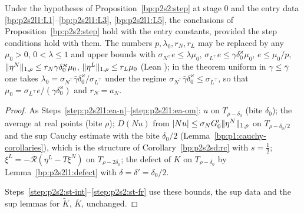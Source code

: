 \begin{proposition}\label{bp:p2s2l1:entryB}
Under the hypotheses of Proposition~\ref{bp:p2s2:step} at stage $0$ and the entry data \ref{bp:p2s2l1:L1}--\ref{bp:p2s2l1:L3}, \ref{bp:p2s2l1:L5}, the
conclusions of Proposition~\ref{bp:p2s2:step} hold with the entry constants, provided the step conditions hold with them. The numbers
$p,\lambda_0,r_N,r_L$ may be replaced by any $\mu_0>0$, $0<\lambda\le1$ and upper bounds with $\sigma_{N^\top}e\le\lambda\mu_0$,
$\sigma_{L^\top}e\le\gamma\delta_0^\varkappa\mu_0$, $e\le\mu_0/p$, $\lVert \eta^N\rVert_{1,\rho}\le r_N\gamma\delta_0^\varkappa\mu_0$, $\lVert \eta^L\rVert_{1,\rho}\le r_L\mu_0$ (Lean
); in the theorem uniform in $\gamma\le\bar\gamma$ one takes $\lambda_0=\sigma_{N^\top}\bar\gamma\delta_0^\varkappa/\sigma_{L^\top}$ under the regime
$\sigma_{N^\top}\bar\gamma\delta_0^\varkappa\le\sigma_{L^\top}$, so that $\mu_0=\sigma_{L^\top}e/(\gamma\delta_0^\varkappa)$ and $r_N=a_N$.
\end{proposition}

\begin{proof}
\label{step:p2s2l1:eb-in}
As Steps~\ref{step:p2s2l1:ea-n}--\ref{step:p2s2l1:ea-om}: $u$ on $T_{\rho-\delta_0}$ (bite $\delta_0$); the average at real points (bite $\rho$); $D(Nu)$ from
$\lvert Nu\rvert\le\sigma_NG_0'\lVert \eta^N\rVert_{1,\rho}$ on $T_{\rho-\delta_0/2}$ and the sup Cauchy estimate with the bite $\delta_0/2$ (Lemma~\ref{bp:p1:cauchy-corollaries}),
which is the structure of Corollary~\ref{bp:p2s2sd:rc} with $s=\frac12$; $\xi^L=-\mathcal R(\eta^L-T\xi^N)$ on $T_{\rho-2\delta_0}$; the defect of $K$ on $T_{\rho-\delta_0}$ by
Lemma~\ref{bp:p2s2l1:defect} with $\delta=\delta'=\delta_0/2$.

\label{step:p2s2l1:eb-rest}
Steps~\ref{step:p2s2:st-int}--\ref{step:p2s2:st-fr} use these bounds, the sup data and the sup lemmas for $\tilde K$, $\bar K$, unchanged.
\end{proof}

